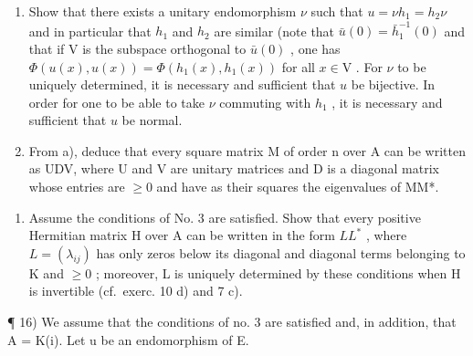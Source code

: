 \begin{enumerate}
\def\labelenumi{\alph{enumi})}
\item
  Show that there exists a unitary endomorphism \(\nu\) such that \(u = \nu h_{1} = h_{2}\nu\) and in particular that \(h_{1}\) and \(h_{2}\) are similar (note that \(\bar{u}(0) = \bar{h}_{1}^{-1}(0)\) and that if V is the subspace orthogonal to \(\bar{u}(0)\) , one has \(\Phi(u(x), u(x)) = \Phi(h_{1}(x), h_{1}(x))\) for all \(x \in \mathrm{V}\) . For \(\nu\) to be uniquely determined, it is necessary and sufficient that \(u\) be bijective. In order for one to be able to take \(\nu\) commuting with \(h_{1}\) , it is necessary and sufficient that \(u\) be normal.
\item
  From a), deduce that every square matrix M of order n over A can be written as UDV, where U and V are unitary matrices and D is a diagonal matrix whose entries are \(\geqslant 0\) and have as their squares the eigenvalues of MM*.
\end{enumerate}

\begin{enumerate}
\def\labelenumi{\arabic{enumi})}
\setcounter{enumi}{14}
\tightlist
\item
  Assume the conditions of No. 3 are satisfied. Show that every positive Hermitian matrix H over A can be written in the form \(LL^{*}\) , where \(L = (\lambda_{ij})\) has only zeros below its diagonal and diagonal terms belonging to K and \(\geqslant 0\) ; moreover, L is uniquely determined by these conditions when H is invertible (cf.~exerc. 10 d) and 7 c).
\end{enumerate}

¶ 16) We assume that the conditions of no. 3 are satisfied and, in addition, that A = K(i). Let u be an endomorphism of E.

